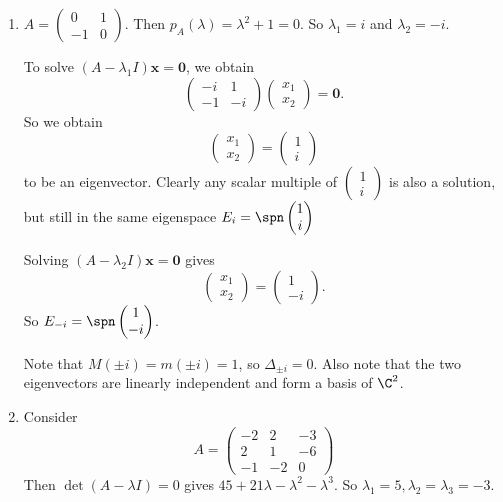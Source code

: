 \documentclass[a4paper]{article}
\begin{document}
\begin{eg}\leavevmode
  \begin{enumerate}
    \item $A = \begin{pmatrix} 0 & 1\\
        -1 & 0
      \end{pmatrix}$. Then $p_A(\lambda) = \lambda^2 + 1 = 0$. So $\lambda_1 = i$ and $\lambda_2 = -i$.

      To solve $(A - \lambda_1 I)\mathbf{x} = \mathbf{0}$, we obtain
      \[
        \begin{pmatrix}
          -i & 1\\-1 & -i
        \end{pmatrix}
        \begin{pmatrix}
          x_1\\x_2
        \end{pmatrix}
        = \mathbf{0}.
      \]
      So we obtain
      \[
        \begin{pmatrix}
          x_1\\x_2
        \end{pmatrix} =
        \begin{pmatrix}
          1\\i
        \end{pmatrix}
      \]
      to be an eigenvector. Clearly any scalar multiple of $\begin{pmatrix}
        1\\i
      \end{pmatrix}$ is also a solution, but still in the same eigenspace $E_i = \spn \begin{pmatrix}
        1\\i
      \end{pmatrix}$

      Solving $(A - \lambda_2I)\mathbf{x} = \mathbf{0}$ gives
      \[
        \begin{pmatrix}
          x_1\\x_2
        \end{pmatrix} =
        \begin{pmatrix}
          1\\-i
        \end{pmatrix}.
      \]
      So $E_{-i} = \spn
      \begin{pmatrix}
        1\\-i
      \end{pmatrix}$.

      Note that $M(\pm i) = m(\pm i) = 1$, so $\Delta_{\pm i} = 0$. Also note that the two eigenvectors are linearly independent and form a basis of $\C^2$.
    \item Consider
      \[
        A = \begin{pmatrix}
          -2 & 2 & -3\\
          2 & 1 & -6\\
          -1 & -2 & 0
        \end{pmatrix}
      \]
      Then $\det(A - \lambda I) = 0$ gives $45 + 21\lambda - \lambda^2 - \lambda^3$. So $\lambda_1 = 5, \lambda_2 = \lambda_3 = -3$.


\end{enumerate}
\end{eg}
\end{document}
